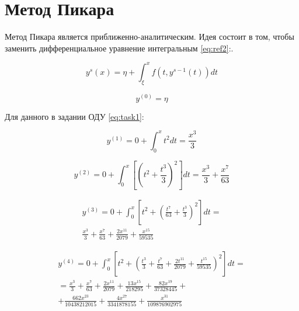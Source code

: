 \documentclass[12pt]{report}
\begin{document}
\section{Метод Пикара}

Метод Пикара является приближенно-аналитическим. Идея состоит в том, чтобы заменить дифференциальное уравнение интегральным \ref{eq:ref2}:.


\begin{equation}
	y^{s}(x) = \eta + \int_{\xi}^{x} f(t, y^{s-1}(t)) dt
	\label{eq:ref2}
\end{equation}

\begin{equation}
	y^{(0)} = \eta
\end{equation}


Для данного в задании ОДУ \ref{eq:task1}:

\begin{equation}
	y^{(1)} = 0 + \int_{0}^{x} t^2 dt= \frac{x^3}{3} 
\end{equation}

\begin{equation}
	y^{(2)} = 0 + \int_{0}^{x}\left[ \left( t^2 + \frac{t^3}{3} \right)^2 \right] dt = \frac{x^3}{3} + \frac{x^7}{63}
\end{equation}

\begin{equation}
	\begin{split}
		y^{(3)} = 0 + \int_{0}^{x}\left[t^2 + \left(\frac{t^7}{63} + \frac{t^3}{3} \right)^2\right] dt = \\ 
		\frac{x^3}{3} + \frac{x^7}{63} + \frac{2x^{11}}{2079} + \frac{x^{15}}{59535}
	\end{split}
\end{equation}

\begin{equation}
	\begin{split}
		y^{(4)} = 0 + \int_{0}^{x}\left[t^2 + \left( \frac{t^3}{3} + \frac{t^7}{63} + \frac{2t^{11}}{2079} + \frac{t^{15}}{59535} \right)^2 \right] dt = \\ 
		= \frac{x^3}{3} + \frac{x^{7}}{63} + \frac{2x^{11}}{2079} + \frac{13x^{15}}{218295} + \frac{82x^{19}}{37328445} + \\
		+ \frac{662x^{23}}{10438212015} + \frac{4x^{27}}{3341878155} + \frac{x^{31}}{109876902975}
	\end{split}
\end{equation}
\end{document}
